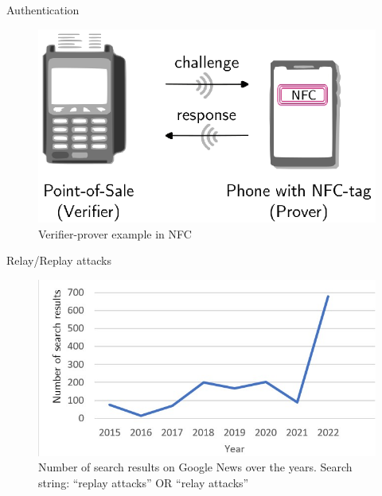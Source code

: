 \begin{frame}{Authentication}
\begin{figure}
    \hspace*{-2.2cm}
    \includegraphics[scale=0.9]{slides/figures/NFC.eps}
    \caption{Verifier-prover example in NFC}
    \label{fig:NFC}
\end{figure}
    
\end{frame}

\begin{frame}{Relay/Replay attacks}
    \begin{figure}
    \hspace*{-1.3cm}
    \includegraphics[scale = 0.85]{slides/figures/googleNews.jpg}
    \caption{Number of search results on Google News over the years. Search string: “replay
attacks” OR “relay attacks”}
    \label{fig:google_news}
\end{figure}
\end{frame}


